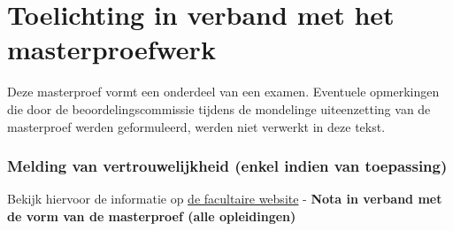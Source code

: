 \chapter*{Toelichting in verband met het masterproefwerk}

Deze masterproef vormt een onderdeel van een examen. Eventuele opmerkingen die door de beoordelingscommissie tijdens de mondelinge uiteenzetting van de masterproef werden geformuleerd, werden niet verwerkt in deze tekst.


\subsection*{Melding van vertrouwelijkheid (enkel indien van toepassing)}

Bekijk hiervoor de informatie op \href{https://www.ugent.be/ea/nl/faculteit/studentenadministratie/masterproef/} {de facultaire website} - \textbf{Nota in verband met de vorm van de masterproef (alle opleidingen)}